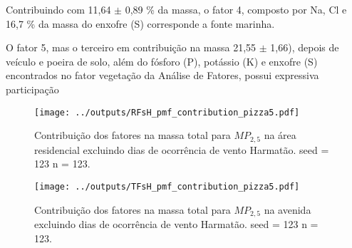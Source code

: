 Contribuindo com 11,64 $\pm$ 0,89 \% da massa, o fator 4, composto por Na, Cl e
16,7 \% da massa do enxofre (S) corresponde a fonte marinha. 

O fator 5, mas o terceiro em contribuição na massa 21,55 $\pm$ 1,66), depois
de veículo e poeira de solo, além do fósforo (P), potássio (K) e enxofre (S) 
encontrados no fator vegetação da Análise de Fatores, possui expressiva 
participação 



\begin{landscape}
  \begin{figure}
    \centering
    \begin{minipage}[b]{0.45\linewidth}
      \texttt{[image: ../outputs/RFsH\_pmf\_contribution\_pizza5.pdf]}
      \caption{Contribuição dos fatores na massa total para $MP_{2,5}$ na área
               residencial excluindo dias de ocorrência de vento Harmatão. seed = 123 n = 123.
               \label{fig:RFsH_contribution5}}
    \end{minipage}%
    \hspace{0.5cm}
    \begin{minipage}[b]{0.45\linewidth}
      
    \end{minipage}
  \end{figure}
\end{landscape}

\begin{landscape}
  \begin{figure}
    \centering
    \begin{minipage}[b]{0.45\linewidth}
      \texttt{[image: ../outputs/TFsH\_pmf\_contribution\_pizza5.pdf]}
      \caption{Contribuição dos fatores na massa total para $MP_{2,5}$ na avenida
               excluindo dias de ocorrência de vento Harmatão. seed = 123 n = 123.
               \label{fig:TFsH_contribution5}}
    \end{minipage}%
    \hspace{0.5cm}
    \begin{minipage}[b]{0.45\linewidth}
      
    \end{minipage}
  \end{figure}
\end{landscape}
 





